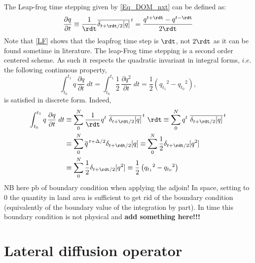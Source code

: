The Leap-frog time stepping given by \eqref{Eq_DOM_nxt} can be defined as:
\begin{equation} \label{LF}
   \frac{\partial q}{\partial t} 
   		\equiv \frac{1}{\rdt} \overline{ \delta _{t+\rdt/2}[q]}^{\,t} 
		=         \frac{q^{t+\rdt}-q^{t-\rdt}}{2\rdt}
\end{equation} 
Note that \eqref{LF} shows that the leapfrog time step is $\rdt$, not $2\rdt$ 
as it can be found sometime in literature. 
The leap-Frog time stepping is a second order centered scheme. As such it respects 
the quadratic invariant in integral forms, $i.e.$ the following continuous property,
\begin{equation} \label{Energy}
\int_{t_0}^{t_1} {q\, \frac{\partial q}{\partial t} \;dt} 
	=\int_{t_0}^{t_1} {\frac{1}{2}\, \frac{\partial q^2}{\partial t} \;dt} 
	=  \frac{1}{2} \left( {q_{t_1}}^2 - {q_{t_0}}^2 \right) ,
\end{equation}
is satisfied in discrete form. Indeed, 
\begin{equation} \begin{split}
\int_{t_0}^{t_1} {q\, \frac{\partial q}{\partial t} \;dt} 
	&\equiv \sum\limits_{0}^{N} 
			{\frac{1}{\rdt} q^t \ \overline{ \delta _{t+\rdt/2}[q]}^{\,t} \ \rdt} 
	   \equiv \sum\limits_{0}^{N}  { q^t \ \overline{ \delta _{t+\rdt/2}[q]}^{\,t} } \\
	&\equiv \sum\limits_{0}^{N}  { \overline{q}^{\,t+\Delta/2}{ \delta _{t+\rdt/2}[q]}}
	   \equiv \sum\limits_{0}^{N}  { \frac{1}{2} \delta _{t+\rdt/2}[q^2] }\\
	&\equiv \sum\limits_{0}^{N}  { \frac{1}{2} \delta _{t+\rdt/2}[q^2] }
	   \equiv \frac{1}{2} \left( {q_{t_1}}^2 - {q_{t_0}}^2 \right)
\end{split} \end{equation}
NB here pb of boundary condition when applying the adjoin! In space, setting to 0 
the quantity in land area is sufficient to get rid of the boundary condition 
(equivalently of the boundary value of the integration by part). In time this boundary 
condition is not physical and \textbf{add something here!!!}







\section{Lateral diffusion operator}

